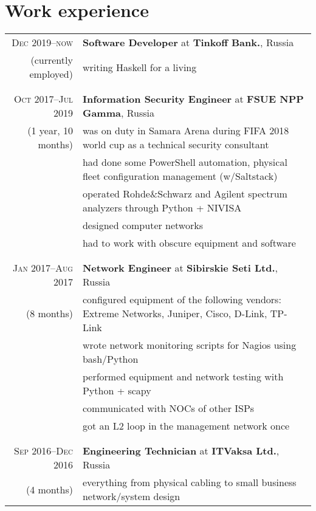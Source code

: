 \documentclass[a4paper,11pt]{article}
\begin{document}
  \section{Work experience}
    \begin{longtable}{r|p{}}
      \textsc{Dec 2019--now     } & \large \sffamily \textbf{Software Developer} at \textbf{Tinkoff Bank.}, Russia    \\
      \nopagebreak
      (currently employed) & writing Haskell for a living \\
      \\&\\
      \textsc{Oct 2017--Jul 2019} & \large \sffamily \textbf{Information Security Engineer} at \textbf{FSUE NPP Gamma},
                                    Russia \\
      \nopagebreak
      (1 year, 10 months) & was on duty in Samara Arena during FIFA 2018 world cup as a technical security
                            consultant                                                                                \\
                          & had done some PowerShell automation, physical fleet configuration management (w/Saltstack)\\
                          & operated Rohde\&Schwarz and Agilent spectrum analyzers through Python + NIVISA            \\
                          & designed computer networks                                                                \\
                          & had to work with obscure equipment and software                                           \\
      \\&\\
      \textsc{Jan 2017--Aug 2017} & \large \sffamily \textbf{Network Engineer} at \textbf{Sibirskie Seti Ltd.}, Russia\\
      \nopagebreak
      (8 months) & configured equipment of the following vendors: Extreme Networks, Juniper, Cisco, D-Link, TP-Link   \\
                 & wrote network monitoring scripts for Nagios using bash/Python                                      \\
                 & performed equipment and network testing with Python + scapy                                        \\
                 & communicated with NOCs of other ISPs                                                               \\
                 & got an L2 loop in the management network once                                                      \\
      \\&\\
      \textsc{Sep 2016--Dec 2016} & \large \sffamily \textbf{Engineering Technician} at \textbf{ITVaksa Ltd.}, Russia \\
      \nopagebreak
      (4 months) & everything from physical cabling to small business network/system design                           \\
    \end{longtable}
\end{document}
